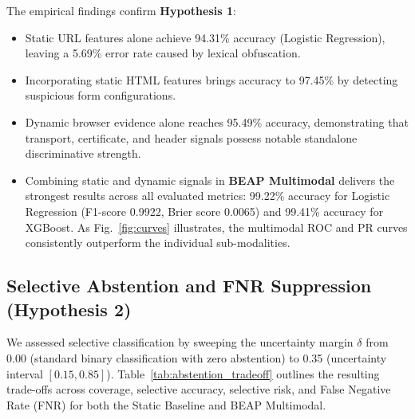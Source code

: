 \documentclass[conference]{IEEEtran}
\begin{document}
The empirical findings confirm \textbf{Hypothesis 1}:
\begin{itemize}[leftmargin=2.5em]
    \item Static URL features alone achieve 94.31\% accuracy (Logistic Regression), leaving a 5.69\% error rate caused by lexical obfuscation.
    \item Incorporating static HTML features brings accuracy to 97.45\% by detecting suspicious form configurations.
    \item Dynamic browser evidence alone reaches 95.49\% accuracy, demonstrating that transport, certificate, and header signals possess notable standalone discriminative strength.
    \item Combining static and dynamic signals in \textbf{BEAP Multimodal} delivers the strongest results across all evaluated metrics: 99.22\% accuracy for Logistic Regression (F1-score 0.9922, Brier score 0.0065) and 99.41\% accuracy for XGBoost. As Fig.~\ref{fig:curves} illustrates, the multimodal ROC and PR curves consistently outperform the individual sub-modalities.
\end{itemize}

\subsection{Selective Abstention and FNR Suppression (Hypothesis 2)}\label{abstention-results}

We assessed selective classification by sweeping the uncertainty margin $\delta$ from 0.00 (standard binary classification with zero abstention) to 0.35 (uncertainty interval $[0.15, 0.85]$). Table~\ref{tab:abstention_tradeoff} outlines the resulting trade-offs across coverage, selective accuracy, selective risk, and False Negative Rate (FNR) for both the Static Baseline and BEAP Multimodal.
\end{document}
